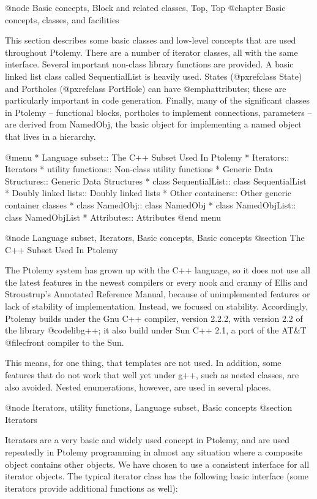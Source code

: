 @node Basic concepts, Block and related classes, Top, Top
@chapter Basic concepts, classes, and facilities

This section describes some basic classes and low-level concepts that
are used throughout Ptolemy.  There are a number of iterator classes,
all with the same interface.  Several important non-class library
functions are provided.  A basic linked list class called
SequentialList is heavily used.  States (@pxref{class State})
and Portholes (@pxref{class PortHole}) can have
@emph{attributes}; these are particularly important in code generation.
Finally, many of the significant classes in Ptolemy -- functional
blocks, portholes to implement connections, parameters -- are derived
from NamedObj, the basic object for implementing a named object that
lives in a hierarchy.

@menu
* Language subset::             The C++ Subset Used In Ptolemy
* Iterators::                   Iterators
* utility functions::           Non-class utility functions
* Generic Data Structures::     Generic Data Structures
* class SequentialList::        class SequentialList
* Doubly linked lists::         Doubly linked lists
* Other containers::            Other generic container classes
* class NamedObj::              class NamedObj
* class NamedObjList::          class NamedObjList
* Attributes::                  Attributes
@end menu

@node Language subset, Iterators, Basic concepts, Basic concepts
@section The C++ Subset Used In Ptolemy

The Ptolemy system has grown up with the C++ language, so it does not
use all the latest features in the newest compilers or every nook and
cranny of Ellis and Stroustrup's Annotated Reference Manual, because
of unimplemented features or lack of stability of implementation.
Instead, we focused on stability.  Accordingly, Ptolemy builds under
the Gnu C++ compiler, version 2.2.2, with version 2.2 of the library
@code{libg++}; it also build under Sun C++ 2.1, a port of the AT&T
@file{cfront} compiler to the Sun.

This means, for one thing, that templates are not used.  In addition,
some features that do not work that well yet under g++, such as
nested classes, are also avoided.  Nested enumerations, however,
are used in several places.

@node Iterators, utility functions, Language subset, Basic concepts
@section Iterators

Iterators are a very basic and widely used concept in Ptolemy, and are
used repeatedly in Ptolemy programming in almost any situation where a
composite object contains other objects.  We have chosen to use a
consistent interface for all iterator objects.  The typical iterator
class has the following basic interface (some iterators provide additional
functions as well):

